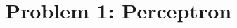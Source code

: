 \documentclass{tron}
\begin{document}
\maketitle
\tableofcontents
\clearpage
{}
\setcounter{page}{1}
\setlength{\parskip}{5pt}
\newpage


\newpage
\section{Problem 1: Perceptron}
\vspace{5pt}
\end{document}

